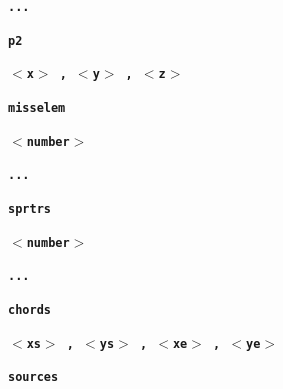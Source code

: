 \documentclass[12pt]{report}
\begin{document}
\textbf{\texttt{...}}


\textbf{\texttt{p2}}

\textbf{\texttt{\begin{math}<\end{math}x\begin{math}>\end{math} ,
\begin{math}<\end{math}y\begin{math}>\end{math} ,
\begin{math}<\end{math}z\begin{math}>\end{math}}}


\textbf{\texttt{misselem}}

\textbf{\texttt{\begin{math}<\end{math}number\begin{math}>\end{math}}}

\textbf{\texttt{...}}

\textbf{\texttt{sprtrs}}

\textbf{\texttt{\begin{math}<\end{math}number\begin{math}>\end{math}}}

\textbf{\texttt{...}}

\textbf{\texttt{chords}}

\textbf{\texttt{\begin{math}<\end{math}xs\begin{math}>\end{math} ,
\begin{math}<\end{math}ys\begin{math}>\end{math} ,
\begin{math}<\end{math}xe\begin{math}>\end{math} ,
\begin{math}<\end{math}ye\begin{math}>\end{math}}}

\textbf{\texttt{sources}}
\end{document}
